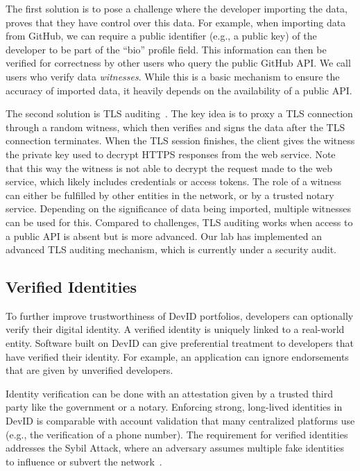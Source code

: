 The first solution is to pose a challenge where the developer importing the data, proves that they have control over this data.
For example, when importing data from GitHub, we can require a public identifier (e.g., a public key) of the developer to be part of the \enquote{bio} profile field.
This information can then be verified for correctness by other users who query the public GitHub API.
We call users who verify data \emph{witnesses}.
While this is a basic mechanism to ensure the accuracy of imported data, it heavily depends on the availability of a public API.

The second solution is TLS auditing~\cite{tlsnotary2014whitepaper}.
The key idea is to proxy a TLS connection through a random witness, which then verifies and signs the data after the TLS connection terminates.
When the TLS session finishes, the client gives the witness the private key used to decrypt HTTPS responses from the web service.
Note that this way the witness is not able to decrypt the request made to the web service, which likely includes credentials or access tokens.
The role of a witness can either be fulfilled by other entities in the network, or by a trusted notary service.
Depending on the significance of data being imported, multiple witnesses can be used for this.
Compared to challenges, TLS auditing works when access to a public API is absent but is more advanced.
Our lab has implemented an advanced TLS auditing mechanism, which is currently under a security audit.

\subsection{Verified Identities}
\label{subsec:strong_identities}
To further improve trustworthiness of DevID portfolios, developers can optionally verify their digital identity.
A verified identity is uniquely linked to a real-world entity.
Software built on DevID can give preferential treatment to developers that have verified their identity.
For example, an application can ignore endorsements that are given by unverified developers.

Identity verification can be done with an attestation given by a trusted third party like the government or a notary.
Enforcing strong, long-lived identities in DevID is comparable with account validation that many centralized platforms use (e.g., the verification of a phone number).
The requirement for verified identities addresses the Sybil Attack, where an adversary assumes multiple fake identities to influence or subvert the network~\cite{douceur2002sybil}.

